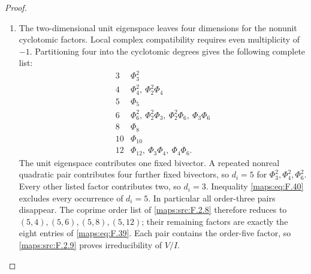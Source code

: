 \documentclass[11pt,a4paper]{article}
\theoremstyle{definition}
\begin{document}
\begin{proof}
\begin{enumerate}[label=\arabic*.]
\item The two-dimensional unit eigenspace leaves four dimensions
for the nonunit cyclotomic factors.  Local complex compatibility
requires even multiplicity of $-1$.  Partitioning four into the
cyclotomic degrees gives the following complete list:
\[
\begin{array}{c|l}
3&\Phi_3^2\\
4&\Phi_4^2,\ \Phi_2^2\Phi_4\\
5&\Phi_5\\
6&\Phi_6^2,\ \Phi_2^2\Phi_3,\ \Phi_2^2\Phi_6,\ \Phi_3\Phi_6\\
8&\Phi_8\\
10&\Phi_{10}\\
12&\Phi_{12},\ \Phi_3\Phi_4,\ \Phi_4\Phi_6.
\end{array}
\]
The unit eigenspace contributes one fixed bivector.  A repeated
nonreal quadratic pair contributes four further fixed bivectors,
so $d_i=5$ for $\Phi_3^2,\Phi_4^2,\Phi_6^2$.
Every other listed factor contributes two, so $d_i=3$.
Inequality \eqref{maps:eq:F.40} excludes every occurrence of
$d_i=5$.  In particular all order-three pairs disappear.
The coprime order list of \cref{maps:src:F.2.8} therefore reduces
to $(5,4),(5,6),(5,8),(5,12)$; their remaining factors are exactly
the eight entries of \eqref{maps:eq:F.39}.
Each pair contains the order-five factor, so
\cref{maps:src:F.2.9} proves irreducibility of $V/I$.
\end{enumerate}
\end{proof}
\end{document}
